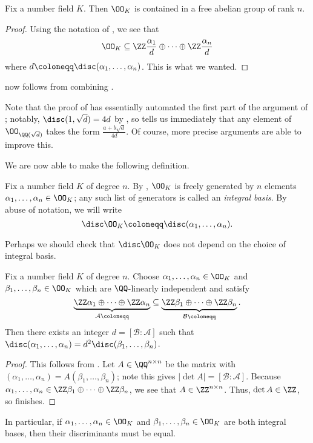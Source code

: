 \documentclass[../notes.tex]{subfiles}
\begin{document}
\begin{corollary} \label{cor:o-k-in-rank-n}
	Fix a number field $K$. Then $\OO_K$ is contained in a free abelian group of rank $n$.
\end{corollary}
\begin{proof}
	Using the notation of , we see that
	\[\OO_K\subseteq\ZZ\frac{\alpha_1}d\oplus\cdots\oplus\ZZ\frac{\alpha_n}d\]
	where $d\coloneqq\disc(\alpha_1,\ldots,\alpha_n)$. This is what we wanted.
\end{proof}
 now follows from combining .
\begin{remark}
	Note that the proof of  has essentially automated the first part of the argument of ; notably, $\disc(1,\sqrt d)=4d$ by , so  tells us immediately that any element of $\OO_{\QQ(\sqrt d)}$ takes the form $\frac{a+b\sqrt d}{4d}$. Of course, more precise arguments are able to improve this.
\end{remark}
We are now able to make the following definition.
\begin{definition}
	Fix a number field $K$ of degree $n$. By , $\OO_K$ is freely generated by $n$ elements $\alpha_1,\ldots,\alpha_n\in\OO_K$; any such list of generators is called an \textit{integral basis}. By abuse of notation, we will write
	\[\disc\OO_K\coloneqq\disc(\alpha_1,\ldots,\alpha_n).\]
\end{definition}
Perhaps we should check that $\disc\OO_K$ does not depend on the choice of integral basis.
\begin{lemma} \label{lem:disc-int-change-of-basis}
	Fix a number field $K$ of degree $n$. Choose $\alpha_1,\ldots,\alpha_n\in\OO_K$ and $\beta_1,\ldots,\beta_n\in\OO_K$ which are $\QQ$-linearly independent and satisfy
	\[\underbrace{\ZZ\alpha_1\oplus\cdots\oplus\ZZ\alpha_n}_{\mathcal A\coloneqq}\subseteq\underbrace{\ZZ\beta_1\oplus\cdots\oplus\ZZ\beta_n}_{\mathcal B\coloneqq}.\]
	Then there exists an integer $d=[\mathcal B:\mathcal A]$ such that $\disc(\alpha_1,\ldots,\alpha_n)=d^2\disc(\beta_1,\ldots,\beta_n)$.
\end{lemma}
\begin{proof}
	This follows from . Let $A\in\QQ^{n\times n}$ be the matrix with $(\alpha_1,\ldots,\alpha_n)=A(\beta_1,\ldots,\beta_n)$; note this gives $\left|\det A\right|=[\mathcal B:\mathcal A]$. Because $\alpha_1,\ldots,\alpha_n\in\ZZ\beta_1\oplus\cdots\oplus\ZZ\beta_n$, we see that $A\in\ZZ^{n\times n}$. Thus, $\det A\in\ZZ$, so  finishes.
\end{proof}
In particular, if $\alpha_1,\ldots,\alpha_n\in\OO_K$ and $\beta_1,\ldots,\beta_n\in\OO_K$ are both integral bases, then their discriminants must be equal.
\end{document}
